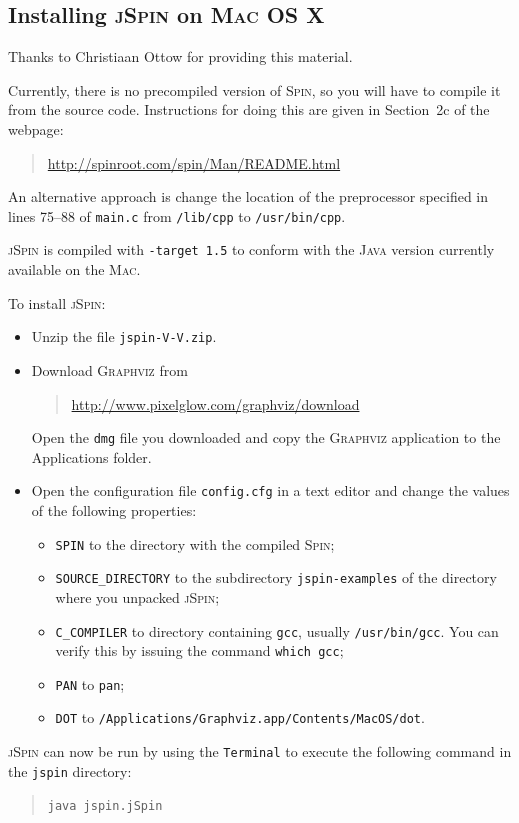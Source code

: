 \documentclass[11pt]{article}
\newcommand{\spn}{\textsc{Spin}}
\newcommand{\js}{\textsc{jSpin}}
\newcommand{\p}[1]{\texttt{#1}}
\begin{document}
\subsection{Installing \js{} on \textsc{Mac OS X}}\label{a.mac}

Thanks to Christiaan Ottow for providing this material.

Currently, there is no precompiled version of \spn{}, so you will have to
compile it from the source code. Instructions for doing this are given
in Section~2c of the webpage:
\begin{quote}
\url{http://spinroot.com/spin/Man/README.html}
\end{quote}
An alternative approach is change the location of the preprocessor specified in 
lines 75--88 of \p{main.c} from \p{/lib/cpp} to \p{/usr/bin/cpp}.

\js{} is compiled with \p{-target 1.5} to conform with the \textsc{Java}
version currently available on the \textsc{Mac}.

To install \js{}:
\begin{itemize}
\item Unzip the file \p{jspin-V-V.zip}.
\item Download \textsc{Graphviz} from
\begin{quote}
\url{http://www.pixelglow.com/graphviz/download}
\end{quote}
Open the \p{dmg} file you downloaded and copy the \textsc{Graphviz}
application to the Applications folder.
\item Open the configuration file \p{config.cfg} in a text editor and change the
values of the following properties: 
\begin{itemize}
\item \p{SPIN} to the directory with the compiled \spn{};
\item \p{SOURCE\_DIRECTORY} to the subdirectory \p{jspin-examples} of the directory
where you unpacked \js{};
\item \p{C\_COMPILER} to directory containing \p{gcc},
usually \p{/usr/bin/gcc}. You can verify this by issuing the command \p{which gcc};
\item \p{PAN} to \p{pan};
\item \p{DOT} to \p{/Applications/Graphviz.app/Contents/MacOS/dot}.
\end{itemize}
\end{itemize}

\js{} can now be run by using the \p{Terminal} to execute the following command
in the \p{jspin} directory:
\begin{quote}
\p{java jspin.jSpin} 
\end{quote}
\end{document}
